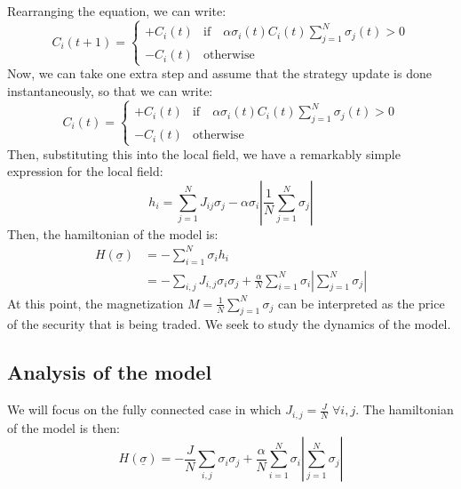 Rearranging the equation, we can write:
\begin{equation}
    C_i(t+1) = \begin{cases}
        +C_i(t) & \text{if} \quad \alpha\sigma_i(t)C_i(t) \sum_{j=1}^N \sigma_j(t)> 0\\
        -C_i(t) & \text{otherwise}
    \end{cases}
\end{equation}
Now, we can take one extra step and assume that the strategy update is done instantaneously, so that we can write:
\begin{equation}
    C_i(t) = \begin{cases}
        +C_i(t) & \text{if} \quad \alpha\sigma_i(t)C_i(t) \sum_{j=1}^N \sigma_j(t)> 0\\
        -C_i(t) & \text{otherwise}
    \end{cases}
\end{equation}
Then, substituting this into the local field, we have a remarkably simple expression for the local field:
\begin{equation}
    h_i=\sum_{j=1}^N J_{i j} \sigma_j-\alpha \sigma_i \left | \frac{1}{N}\sum_{j=1}^N \sigma_j \right |
\end{equation}
Then, the hamiltonian of the model is:
\begin{equation}
    \begin{aligned}
        H(\underline{\sigma}) &= -\sum_{i=1}^N \sigma_i h_i\\
        &= -\sum_{i,j}J_{i,j}\sigma_i\sigma_j + \frac{\alpha}{N}\sum_{i=1}^N \sigma_i \left | \sum_{j=1}^N \sigma_j \right |
    \end{aligned}
\end{equation}
At this point, the magnetization \(M = \frac{1}{N}\sum_{j=1}^N \sigma_j\) can be interpreted as the price of the security that is being traded. We seek to study the dynamics of the model.

\subsection{Analysis of the model}
We will focus on the fully connected case in which \(J_{i,j}=\frac{J}{N} \; \forall i,j\). The hamiltonian of the model is then:
\begin{equation}
    H(\underline{\sigma}) = -\frac{J}{N}\sum_{i,j}\sigma_i\sigma_j + \frac{\alpha}{N}\sum_{i=1}^N \sigma_i \left | \sum_{j=1}^N \sigma_j \right |
\end{equation}

